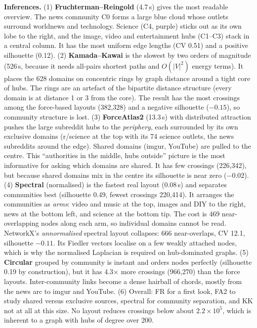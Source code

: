 \textbf{Inferences.}
(1) \textbf{Fruchterman--Reingold} (4.7\,s) gives the most readable overview. The news community C0 forms a large blue cloud
whose outlets surround worldnews and technology. Science (C4, purple) sticks out as its own lobe to the right, and the
image, video and entertainment hubs (C1--C3) stack in a central column. It has the most uniform edge lengths (CV 0.51) and a
positive silhouette (0.12).
(2) \textbf{Kamada--Kawai} is the slowest by two orders of magnitude (526\,s, because it needs all-pairs shortest paths and
$O(|V|^2)$ energy terms). It places the 628 domains on concentric rings by graph distance around a tight core of hubs. The
rings are an artefact of the bipartite distance structure (every domain is at distance 1 or 3 from the core). The result
has the most crossings among the force-based layouts (382,328) and a negative silhouette ($-0.15$), so community
structure is lost.
(3) \textbf{ForceAtlas2} (13.3\,s) with distributed attraction pushes the large subreddit hubs to the \emph{periphery}, each
surrounded by its own exclusive domains (r/science at the top with its 74 science outlets, the news subreddits around the
edge). Shared domains (imgur, YouTube) are pulled to the centre. This ``authorities in the middle, hubs outside'' picture is
the most informative for asking which domains are shared. It has few crossings (226,342), but because shared domains mix in
the centre its silhouette is near zero ($-0.02$).
(4) \textbf{Spectral} (normalised) is the fastest real layout (0.08\,s) and separates communities best (silhouette 0.49,
fewest crossings 220,414). It arranges the communities as \emph{arms}: video and music at the top, images and DIY to the
right, news at the bottom left, and science at the bottom tip. The cost is 469 near-overlapping nodes along each arm, so
individual domains cannot be read. NetworkX's \emph{unnormalised} spectral layout collapses: 666 near-overlaps, CV 12.1,
silhouette $-0.11$. Its Fiedler vectors localise on a few weakly attached nodes, which is why the normalised Laplacian is
required on hub-dominated graphs.
(5) \textbf{Circular} grouped by community is instant and orders nodes perfectly (silhouette 0.19 by construction), but it
has 4.3$\times$ more crossings (966,270) than the force layouts. Inter-community links become a dense hairball of chords,
mostly from the news arc to imgur and YouTube.
(6) Overall: FR for a first look, FA2 to study shared versus exclusive sources, spectral for community separation, and
KK not at all at this size. No layout reduces crossings below about $2.2\times10^5$, which is inherent to a graph with
hubs of degree over 200.

